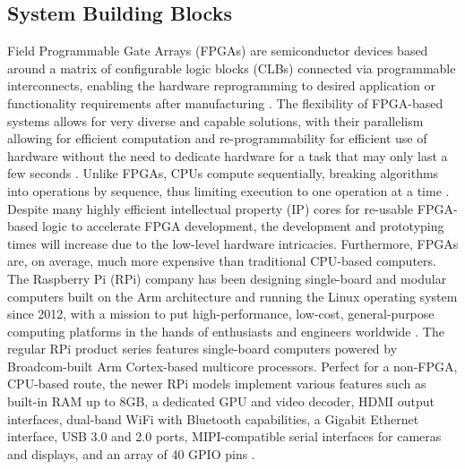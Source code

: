 \subsection{System Building Blocks}
\label{bi_bb}
Field Programmable Gate Arrays (FPGAs) are semiconductor devices based around a matrix of configurable logic blocks (CLBs) connected via programmable interconnects, enabling the hardware reprogramming to desired application or functionality requirements after manufacturing \cite{WhatFPGAField}. The flexibility of FPGA-based systems allows for very diverse and capable solutions, with their parallelism allowing for efficient computation and re-programmability for efficient use of hardware without the need to dedicate hardware for a task that may only last a few seconds \cite{villalpandoReconfigurableMachineVision2010}. Unlike FPGAs, CPUs compute sequentially, breaking algorithms into operations by sequence, thus limiting execution to one operation at a time \cite{alexliangBoostingMachineVision2016}. Despite many highly efficient intellectual property (IP) cores for re-usable FPGA-based logic to accelerate FPGA development, the development and prototyping times will increase due to the low-level hardware intricacies. Furthermore, FPGAs are, on average, much more expensive than traditional CPU-based computers. The Raspberry Pi (RPi) company has been designing single-board and modular computers built on the Arm architecture and running the Linux operating system since 2012, with a mission to put high-performance, low-cost, general-purpose computing platforms in the hands of enthusiasts and engineers worldwide \cite{raspberrypiRaspberryPiUs}. The regular RPi product series features single-board computers powered by Broadcom-built Arm Cortex-based multicore processors. Perfect for a non-FPGA, CPU-based route, the newer RPi models implement various features such as built-in RAM up to 8GB, a dedicated GPU and video decoder, HDMI output interfaces, dual-band WiFi with Bluetooth capabilities, a Gigabit Ethernet interface, USB 3.0 and 2.0 ports, MIPI-compatible serial interfaces for cameras and displays, and an array of 40 GPIO pins \cite{raspberrypiltdBuyRaspberryPi, raspberrypiltdBuyRaspberryPia}.


